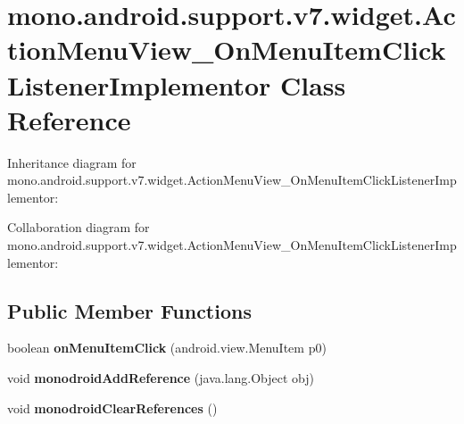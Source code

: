 \hypertarget{classmono_1_1android_1_1support_1_1v7_1_1widget_1_1_action_menu_view___on_menu_item_click_listener_implementor}{}\section{mono.\+android.\+support.\+v7.\+widget.\+Action\+Menu\+View\+\_\+\+On\+Menu\+Item\+Click\+Listener\+Implementor Class Reference}
\label{classmono_1_1android_1_1support_1_1v7_1_1widget_1_1_action_menu_view___on_menu_item_click_listener_implementor}


Inheritance diagram for mono.\+android.\+support.\+v7.\+widget.\+Action\+Menu\+View\+\_\+\+On\+Menu\+Item\+Click\+Listener\+Implementor\+:


Collaboration diagram for mono.\+android.\+support.\+v7.\+widget.\+Action\+Menu\+View\+\_\+\+On\+Menu\+Item\+Click\+Listener\+Implementor\+:
\subsection*{Public Member Functions}
\begin{DoxyCompactItemize}
\item 
\mbox{\label{classmono_1_1android_1_1support_1_1v7_1_1widget_1_1_action_menu_view___on_menu_item_click_listener_implementor_aa7f3b619c6a59d9cdca534581c1a6296}} 
boolean {\bfseries on\+Menu\+Item\+Click} (android.\+view.\+Menu\+Item p0)
\item 
\mbox{\label{classmono_1_1android_1_1support_1_1v7_1_1widget_1_1_action_menu_view___on_menu_item_click_listener_implementor_ae2429823c873f4a58b4cf51c81bc06e9}} 
void {\bfseries monodroid\+Add\+Reference} (java.\+lang.\+Object obj)
\item 
\mbox{\label{classmono_1_1android_1_1support_1_1v7_1_1widget_1_1_action_menu_view___on_menu_item_click_listener_implementor_a9e0f4ab4d26d48e5e567bd67f4464001}} 
void {\bfseries monodroid\+Clear\+References} ()
\end{DoxyCompactItemize}
